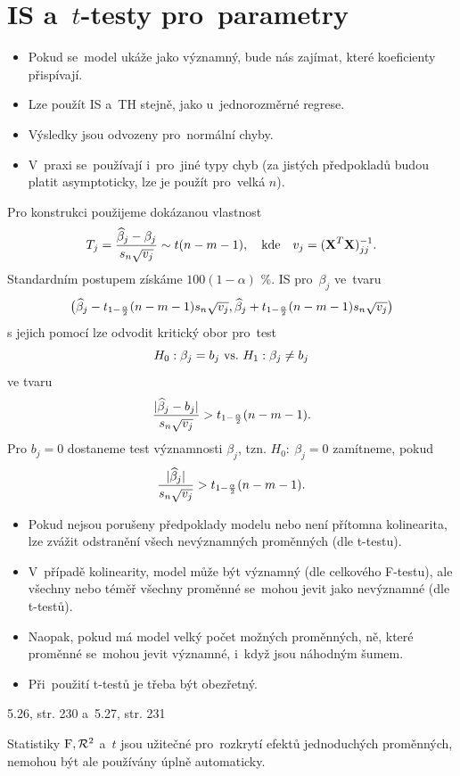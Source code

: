 \section{IS a~$t$-testy pro~parametry}
\begin{itemize}
	\item Pokud se~model ukáže jako významný, bude nás zajímat, které koeficienty přispívají.
	\item Lze použít IS a~TH stejně, jako u~jednorozměrné regrese.
	\item Výsledky jsou odvozeny pro~normální chyby.
	\item V~praxi se~používají i~pro~jiné typy chyb (za jistých předpokladů budou platit asymptoticky, lze je použít pro~velká $n$).
\end{itemize}
Pro konstrukci použijeme dokázanou vlastnost
 $$ T_j = \frac{\widehat{\beta}_j-\beta_j}{s_n\sqrt{v_j}}\sim t(n-m-1),\quad\text{kde}\quad v_j = (\textbf{X}^T\textbf{X})_{jj}^{-1}. $$
Standardním postupem získáme $100(1-\alpha)$ \%. IS pro~$\beta_j$ ve~tvaru
 $$ \big(\widehat{\beta}_j-t_{1-\frac{\alpha}{2}}(n-m-1)s_n\sqrt{v_j},\widehat{\beta}_j+t_{1-\frac{\alpha}{2}}(n-m-1)s_n\sqrt{v_j} \big) $$
s jejich pomocí lze odvodit kritický obor pro~test
 $$ H_0: \beta_j = b_j ~\text{vs.}~ H_1: \beta_j\neq b_j $$
ve tvaru
 $$ \frac{|\widehat{\beta}_j-b_j|}{s_n\sqrt{v_j}}>t_{1-\frac{\alpha}{2}}(n-m-1). $$
Pro $b_j = 0$ dostaneme test významnosti $\beta_j$, tzn. $H_0:~\beta_j = 0$ zamítneme, pokud
 $$ \frac{|\widehat{\beta}_j|}{s_n\sqrt{v_j}}>t_{1-\frac{\alpha}{2}}(n-m-1). $$
\begin{remark}
	\begin{itemize}
		\item Pokud nejsou porušeny předpoklady modelu nebo není přítomna kolinearita, lze zvážit odstranění všech nevýznamných proměnných (dle t-testu).
		\item V~případě kolinearity, model může být významný (dle celkového F-testu), ale všechny nebo téměř všechny proměnné se~mohou jevit jako nevýznamné (dle t-testů).
		\item Naopak, pokud má model velký počet možných proměnných, ně, které proměnné se~mohou jevit významné, i~když jsou náhodným šumem.
		\item Při~použití t-testů je třeba být obezřetný.
	\end{itemize}
\end{remark}
\begin{example}
	5.26, str. 230 a~5.27, str. 231
\end{example}
\begin{remark}
	Statistiky $\mathrm{F},\mathcal{R}^2$ a~$t$ jsou užitečné pro~rozkrytí efektů jednoduchých proměnných, nemohou být ale používány úplně automaticky.
\end{remark}

